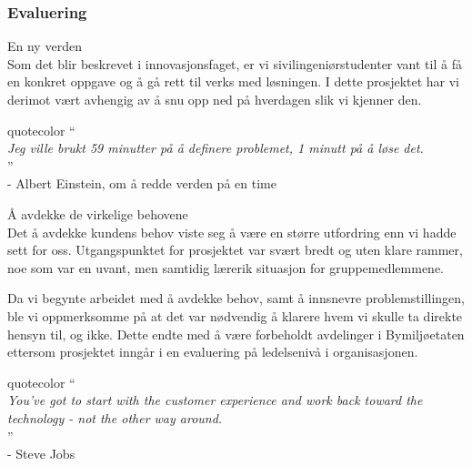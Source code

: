 \documentclass[xetex]{beamer}
\begin{document}
\begin{frame}\label{fr:evaluering}
	\frametitle{Evaluering}
	{\footnotesize\alert{En ny verden}}\\
	Som det blir beskrevet i innovasjonsfaget, er vi sivilingeniørstudenter vant til å få en 
konkret oppgave og å gå rett til verks med løsningen. I dette prosjektet har vi derimot 
vært avhengig av å snu opp ned på hverdagen slik vi kjenner den. 

		\hspace{11em}\begin{beamercolorbox}[wd=0.50\paperwidth, ht=12ex, dp=6pt, leftskip=.3cm, rightskip=.3cm]{quotecolor}
		\huge`` \\[-0.5em]
		\tiny
		\hspace{1.5em}\vspace{0.0em}\emph{Jeg ville brukt 59 minutter på å definere problemet, 1 minutt på å løse det.} \\ [-1.8em]
		
		\hspace{0.43\paperwidth}\huge'' \\ [-0.4em]
		
		\hfill\tiny- Albert Einstein, om å redde verden på en time \\ [1em] 
	\end{beamercolorbox}

	{\footnotesize\alert{Å avdekke de virkelige behovene}}\\
Det å avdekke kundens behov viste seg å være en større utfordring enn vi hadde 
sett for oss. Utgangspunktet for prosjektet var svært \alert{bredt} og uten klare rammer, noe 
som var en uvant, men samtidig lærerik situasjon for gruppemedlemmene. 

Da vi begynte arbeidet med å avdekke behov, samt å innsnevre problemstillingen, ble vi oppmerksomme på at det var nødvendig å klarere hvem vi skulle ta direkte \alert{hensyn} til, og ikke. Dette endte med å være forbeholdt avdelinger i Bymiljøetaten ettersom prosjektet inngår i en \alert{evaluering på ledelsenivå} i organisasjonen. 

		\vspace{1em}
		
		\hspace{11em}\begin{beamercolorbox}[wd=0.50\paperwidth, ht=12ex, dp=6pt, leftskip=.3cm, rightskip=.3cm]{quotecolor}
		\huge`` \\[-0.5em]
		\tiny
		\hspace{1.5em}\vspace{0.0em}\emph{You've got to start with the customer experience and work back toward the technology - not the other way around.} \\ [-1.8em]
		
		\hspace{0.43\paperwidth}\huge'' \\ [-0.3em]
		
		\hfill\tiny- Steve Jobs \\ [1em] 
	\end{beamercolorbox}
\end{frame}
\end{document}
